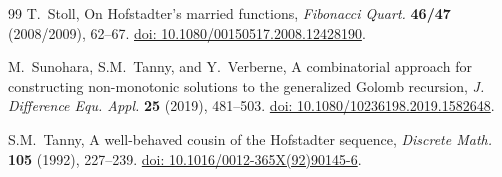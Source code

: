 \documentclass[11pt]{article}
\theoremstyle{definition}
\theoremstyle{remark}
\begin{document}
\begin{thebibliography}{99}
T.~Stoll,
On Hofstadter's married functions,
\textit{Fibonacci Quart.} \textbf{46/47} (2008/2009), 62--67.
\href{https://doi.org/10.1080/00150517.2008.12428190}{doi: 10.1080/00150517.2008.12428190}.

M.~Sunohara, S.M.~Tanny, and Y.~Verberne,
A combinatorial approach for constructing non-monotonic solutions to the
generalized Golomb recursion,
\textit{J. Difference Equ. Appl.} \textbf{25} (2019), 481--503.
\href{https://doi.org/10.1080/10236198.2019.1582648}{doi: 10.1080/10236198.2019.1582648}.

S.M.~Tanny,
A well-behaved cousin of the Hofstadter sequence,
\textit{Discrete Math.} \textbf{105} (1992), 227--239.
\href{https://doi.org/10.1016/0012-365X(92)90145-6}{doi: 10.1016/0012-365X(92)90145-6}.

\end{thebibliography}
\end{document}
